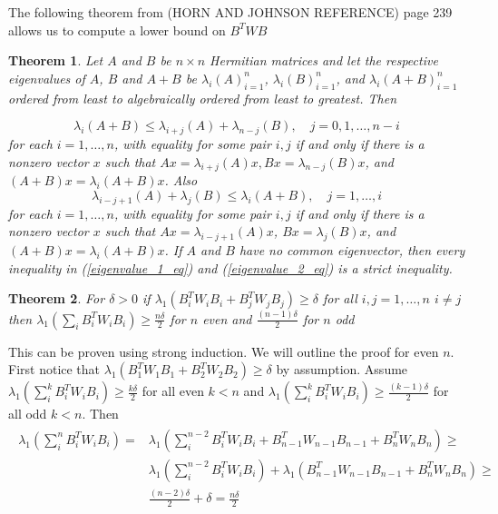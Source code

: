 \documentclass[]{article}
\newtheorem{theorem}{Theorem}
\begin{document}
The following theorem from (HORN AND JOHNSON REFERENCE) page 239 allows us to compute a lower bound on $B^TWB$

\begin{theorem} \label{theorem_1}
	Let $A$ and $B$ be $n \times n$ Hermitian matrices and let the respective eigenvalues of $A$, $B$ and $A + B$ be ${\lambda_i(A)}^n_{i=1}$, ${\lambda_i(B)}^n_{i=1}$, and ${\lambda_i(A+B)}^n_{i=1}$ ordered from least to algebraically ordered from least to greatest.  Then
	
	\begin{equation}\label{eigenvalue_1_eq}
	\lambda_i(A+B) \leq \lambda_{i+j}(A) + \lambda_{n-j}(B),\quad j = 0, 1, \dots, n-i
	\end{equation}
	for each $i = 1, \dots, n$, with equality for some pair $i, j$ if and only if there is a nonzero vector $x$ such that $Ax=\lambda_{i+j}(A)x, Bx = \lambda_{n-j}(B)x$, and $(A+B)x = \lambda_i(A+B)x$.  Also
	\begin{equation} \label{eigenvalue_2_eq}
	\lambda_{i-j+1}(A) + \lambda_j(B) \leq \lambda_i(A+B), \quad j=1,\dots,i
	\end{equation}
	for each $i = 1, \dots, n$, with equality for some pair $i, j$ if and only if there is a nonzero vector $x$ such that $Ax = \lambda_{i-j+1}(A)x$, $Bx = \lambda_j(B)x$, and $(A+B)x = \lambda_i(A+B)x$. If $A$ and $B$ have no common eigenvector, then every inequality in (\ref{eigenvalue_1_eq}) and (\ref{eigenvalue_2_eq}) is a strict inequality.
\end{theorem}

\begin{theorem} \label{theorem_2}
	 For $\delta > 0$ if $\lambda_1(B^T_iW_iB_i + B^T_jW_jB_j) \geq \delta$ for all $i, j = 1, \dots, n$ $i \ne j$ then $\lambda_1(\sum_i B^T_iW_iB_i) \geq \frac{n\delta}{2}$ for $n$ even and $\frac{(n-1)\delta}{2}$ for $n$ odd
\end{theorem}

This can be proven using strong induction.  We will outline the proof for even $n$.  First notice that $\lambda_1(B^T_1W_1B_1 + B^T_2W_2B_2) \geq \delta$ by assumption.  Assume $\lambda_1(\sum^k_i B^T_iW_iB_i) \geq \frac{k\delta}{2}$ for all even $k < n$ and $\lambda_1(\sum^k_i B^T_iW_iB_i) \geq \frac{(k-1)\delta}{2}$ for all odd $k < n$.  Then 
\begin{align*}
\begin{aligned}
\lambda_1(\sum^n_iB^T_iW_iB_i) = &\lambda_1(\sum^{n-2}_i B^T_iW_iB_i + B^T_{n-1}W_{n-1}B_{n-1} +  B^T_{n}W_{n}B_{n}) \geq \\
&\lambda_1(\sum^{n-2}_i B^T_iW_iB_i) +  \lambda_1(B^T_{n-1}W_{n-1}B_{n-1} + B^T_{n}W_{n}B_{n}) \geq \\
&\frac{(n-2)\delta}{2} + \delta = \frac{n\delta}{2}
\end{aligned}
\end{align*}
\end{document}

